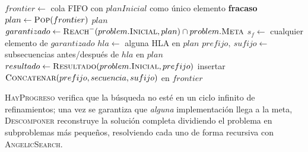 \begin{algorithm}[H]
\caption{ANGELIC-SEARCH($problem$, $hierarchy$, $planInicial$)}
\begin{algorithmic}[1]
\State $frontier \gets$ cola FIFO con $planInicial$ como único elemento
     \Return \textbf{fracaso} \EndIf
    \State $plan \gets \Call{Pop}{frontier}$
         \Return $plan$ \EndIf
        \State $garantizado \gets \textsc{Reach}^-(problem.\textsc{Inicial},plan) \cap
        problem.\textsc{Meta}$
            \State $s_f \gets$ cualquier elemento de $garantizado$
            \State \Return {}
        \EndIf
        \State $hla \gets$ alguna HLA en $plan$
        \State $prefijo,\ sufijo \gets$ subsecuencias antes/después de $hla$ en $plan$
        \State $resultado \gets \textsc{Resultado}(problem.\textsc{Inicial},prefijo)$
            \State insertar $\textsc{Concatenar}(prefijo,secuencia,sufijo)$ en $frontier$
        \EndFor
    \EndIf
\EndWhile
\end{algorithmic}
\end{algorithm}

\textsc{HayProgreso} verifica que la búsqueda no esté en un ciclo infinito de refinamientos; una vez
se garantiza que \emph{alguna} implementación llega a la meta, \textsc{Descomponer} reconstruye la
solución completa dividiendo el problema en subproblemas más pequeños, resolviendo cada uno de forma
recursiva con \textsc{AngelicSearch}.

